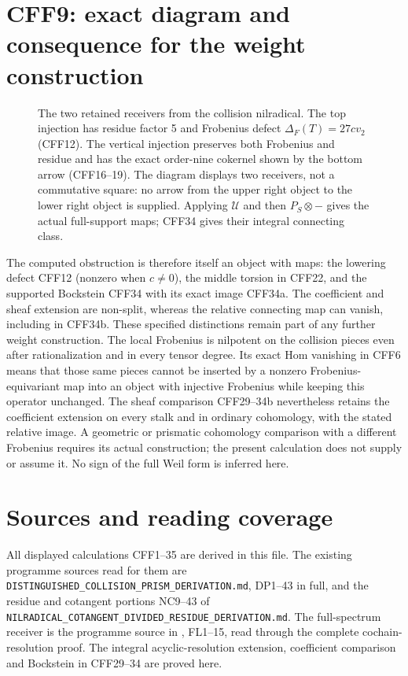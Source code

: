 \documentclass[11pt]{article}
\begin{document}
\section{CFF9: exact diagram and consequence for the weight construction}
\begin{figure}[ht]
\centering
{}
\caption{The two retained receivers from the collision nilradical.
The top injection has residue factor 5 and Frobenius defect
\(\Delta_F(T)=27cv_2\) (CFF12). The vertical injection preserves
both Frobenius and residue and has the exact order-nine cokernel
shown by the bottom arrow (CFF16--19). The diagram displays two
receivers, not a commutative square: no arrow from the upper
right object to the lower right object is supplied. Applying
\(\mathcal U\) and then \(P_S\otimes-\) gives the actual full-support
maps; CFF34 gives their integral connecting class.}
\end{figure}

The computed obstruction is therefore itself an object with
maps: the lowering defect CFF12 (nonzero when \(c\ne0\)),
the middle torsion in CFF22, and the supported Bockstein
CFF34 with its exact image CFF34a. The coefficient and
sheaf extension are non-split, whereas the relative
connecting map can vanish, including in CFF34b.
These specified distinctions remain part of any further
weight construction. The local Frobenius is nilpotent on
the collision pieces even after rationalization and in
every tensor degree. Its exact Hom vanishing in CFF6
means that those same pieces cannot be inserted by a
nonzero Frobenius-equivariant map into an object with
injective Frobenius while keeping this operator unchanged.
The sheaf comparison CFF29--34b nevertheless retains
the coefficient extension on every stalk and in ordinary
cohomology, with the stated relative image. A geometric or prismatic cohomology
comparison with a different Frobenius requires its actual
construction; the present calculation does not supply or
assume it. No sign of the full Weil form is inferred here.

\section*{Sources and reading coverage}
All displayed calculations CFF1--35 are derived in this file.
The existing programme sources read for them are
\texttt{DISTINGUISHED\_COLLISION\_PRISM\_DERIVATION.md},
DP1--43 in full, and the residue and cotangent portions
NC9--43 of
\texttt{NILRADICAL\_COTANGENT\_DIVIDED\_RESIDUE\_DERIVATION.md}.
The full-spectrum receiver is the programme source
in ,
FL1--15, read through the complete cochain-resolution proof.
The integral acyclic-resolution extension, coefficient
comparison and Bockstein in CFF29--34 are proved here.
\end{document}
